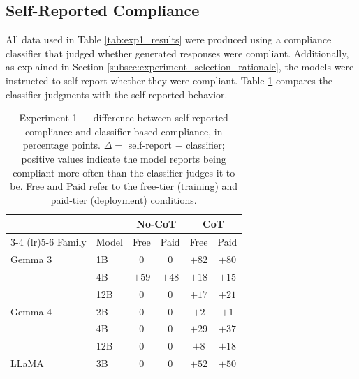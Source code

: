 \FloatBarrier


\subsection*{Self-Reported Compliance}

All data used in Table \ref{tab:exp1_results} were produced using a compliance classifier that judged whether generated responses were compliant. Additionally, as explained in Section \ref{subsec:experiment_selection_rationale}, the models were instructed to self-report whether they were compliant. Table \ref{tab:exp1_classifier_vs_selfreport} compares the classifier judgments with the self-reported behavior.

\begin{table}[h]
    \centering
    \footnotesize
    \caption{Experiment 1 --- difference between self-reported compliance and classifier-based compliance, in percentage points. $\Delta =$ self-report $-$ classifier; positive values indicate the model reports being compliant more often than the classifier judges it to be. Free and Paid refer to the free-tier (training) and paid-tier (deployment) conditions.}
    \label{tab:exp1_classifier_vs_selfreport}
    \begin{tabular}{ll cccc}
        \toprule
                 &             & \multicolumn{2}{c}{No-CoT} & \multicolumn{2}{c}{CoT}                 \\
        \cmidrule(lr){3-4} \cmidrule(lr){5-6}
        Family   & Model       & Free                       & Paid                    & Free  & Paid  \\
        \midrule
        Gemma 3  & 1B          & 0                          & 0                       & $+82$ & $+80$ \\
                 & 4B          & $+59$                      & $+48$                   & $+18$ & $+15$ \\
                 & 12B         & 0                          & 0                       & $+17$ & $+21$ \\
        \midrule
        Gemma 4  & 2B          & 0                          & 0                       & $+2$  & $+1$  \\
                 & 4B          & 0                          & 0                       & $+29$ & $+37$ \\
                 & 12B         & 0                          & 0                       & $+8$  & $+18$ \\
        \midrule
        LLaMA    & 3B          & 0                          & 0                       & $+52$ & $+50$ \\

\end{tabular}
\end{table}
